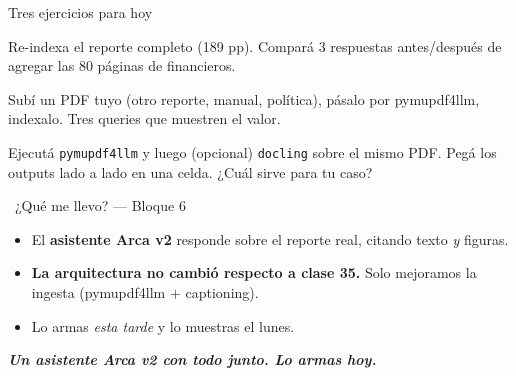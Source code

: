 \documentclass[aspectratio=169, 11pt]{beamer}
\begin{document}
\begin{frame}[shrink]{Tres ejercicios para hoy}
  \vspace{6pt}
  \begin{tcolorbox}[colback=arcaGray, colframe=codeBlue, leftrule=3pt,
    boxrule=0pt, sharp corners, left=8pt, right=8pt, top=4pt, bottom=4pt,
    title={\scriptsize\color{white}\bfseries E1 --- aumentar la cobertura},
    coltitle=white, colbacktitle=codeBlue, fonttitle=\scriptsize]
    {\footnotesize\color{textDark}
    Re-indexa el reporte completo (189 pp). Compará 3 respuestas antes/después
    de agregar las 80 páginas de financieros.}
  \end{tcolorbox}
  \vspace{4pt}
  \begin{tcolorbox}[colback=arcaGray, colframe=codeOrange, leftrule=3pt,
    boxrule=0pt, sharp corners, left=8pt, right=8pt, top=4pt, bottom=4pt,
    title={\scriptsize\color{white}\bfseries E2 --- tu propio PDF},
    coltitle=white, colbacktitle=codeOrange, fonttitle=\scriptsize]
    {\footnotesize\color{textDark}
    Subí un PDF tuyo (otro reporte, manual, política), pásalo por pymupdf4llm,
    indexalo. Tres queries que muestren el valor.}
  \end{tcolorbox}
  \vspace{4pt}
  \begin{tcolorbox}[colback=arcaGray, colframe=codeGreen, leftrule=3pt,
    boxrule=0pt, sharp corners, left=8pt, right=8pt, top=4pt, bottom=4pt,
    title={\scriptsize\color{white}\bfseries E3 --- comparar dos librerías},
    coltitle=white, colbacktitle=codeGreen, fonttitle=\scriptsize]
    {\footnotesize\color{textDark}
    Ejecutá \texttt{pymupdf4llm} y luego (opcional) \texttt{docling} sobre el
    mismo PDF. Pegá los outputs lado a lado en una celda. ¿Cuál sirve para tu caso?}
  \end{tcolorbox}
\end{frame}

\begin{frame}[shrink]{\faIndustry\ ¿Qué me llevo? --- Bloque 6}
  \vspace{6pt}
  \begin{itemize}\setlength{\itemsep}{5pt}
    \footnotesize
    \item El \textbf{asistente Arca v2} responde sobre el reporte real, citando
    texto \emph{y} figuras.
    \item \textbf{La arquitectura no cambió respecto a clase 35.} Solo
    mejoramos la ingesta (pymupdf4llm $+$ captioning).
    \item Lo armas \emph{esta tarde} y lo muestras el lunes.
  \end{itemize}
  \vspace{12pt}
  \begin{tcolorbox}[colback=arcaRed!8, colframe=arcaRed, leftrule=3pt,
    boxrule=0pt, sharp corners, left=8pt, right=8pt, top=4pt, bottom=4pt]
    {\footnotesize\color{arcaDark}\bfseries
    \emph{Un asistente Arca v2 con todo junto. Lo armas hoy.}}
  \end{tcolorbox}
\end{frame}
\end{document}
